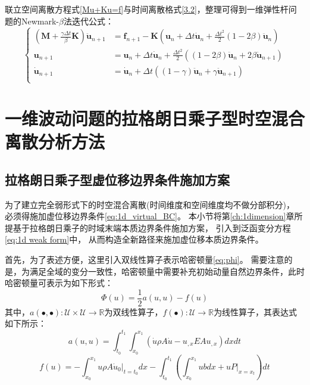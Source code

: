 联立空间离散方程式\eqref{Mu+Ku=f}与时间离散格式\eqref{3.2}，整理可得到一维弹性杆问题的Newmark-$\beta$法迭代公式：
\begin{equation}\label{3.5}
\left \{
\begin{split}
\left(\boldsymbol{M} + \frac{\gamma \Delta t}{\beta} \boldsymbol{K}\right)\ddot{\boldsymbol{u}}_{n+1} &= \boldsymbol{f}_{n+1} - \boldsymbol{K}\left(\boldsymbol{u}_n + \Delta t \dot{\boldsymbol{u}}_n + \frac{\Delta t^2}{2}(1 - 2\beta)\ddot{\boldsymbol{u}}_n\right) \\
\boldsymbol{u}_{n+1} &= \boldsymbol{u}_n + \Delta t \dot{\boldsymbol{u}}_n + \frac{\Delta t^2}{2}\left((1 - 2\beta)\ddot{\boldsymbol{u}}_n + 2\beta\ddot{\boldsymbol{u}}_{n+1}\right) \\
\dot{\boldsymbol{u}}_{n+1} &= \dot{\boldsymbol{u}}_n + \Delta t\left((1 - \gamma)\ddot{\boldsymbol{u}}_n + \gamma\ddot{\boldsymbol{u}}_{n+1}\right) \\
\end{split}
\right .
\end{equation}




\section{一维波动问题的拉格朗日乘子型时空混合离散分析方法}

\subsection{拉格朗日乘子型虚位移边界条件施加方案}

为了建立完全弱形式下的时空混合离散(时间维度和空间维度均不做分部积分)，
必须得施加虚位移边界条件\eqref{eq:1d_virtual_BC}。
本小节将第\ref{ch:1dimension}章所提基于拉格朗日乘子的时域末端本质边界条件施加方案，
引入到泛函变分方程\eqref{eq:1d weak form}中，
从而构造全新路径来施加虚位移本质边界条件。

首先，为了表述方便，这里引入双线性算子表示哈密顿量\eqref{eq:phi}。
需要注意的是，为满足全域的变分一致性，哈密顿量中需要补充初始动量自然边界条件，此时哈密顿量可表示为如下形式：
\begin{equation}\label{eq:hmd}
    \Phi(u) = \frac{1}{2} a(u,u) - f(u)
\end{equation}
其中，$a(\bullet,\bullet):\mathcal U \times \mathcal U \rightarrow \mathbb R$为双线性算子，$f(\bullet):\mathcal U \rightarrow \mathbb R$为线性算子，其表达式如下所示：
\begin{equation}\label{eq:auu}
    a(u,u) = \int_{t_0}^{t_1} \int_{x_0}^{x_1} (\dot u \rho A \dot u - u_{,x} EA u_{,x}) dx dt
\end{equation}
\begin{equation}\label{eq:fu}
    f(u) = 
    - \int_{x_0}^{x_1} u \rho A \dot u_0 \vert_{t=t_0} dx
    - \int_{t_0}^{t_1} \left (\int_{x_0}^{x_1} ub dx  + uP \vert_{x=x_t}\right )dt
\end{equation}

